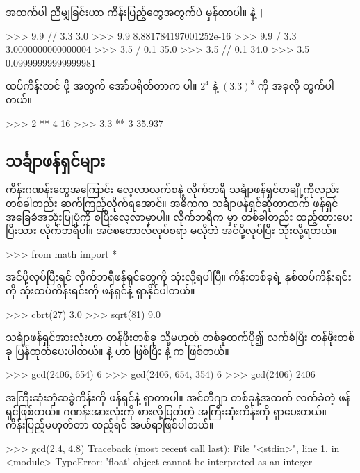 အထက်ပါ ညီမျှခြင်းဟာ ကိန်းပြည့်တွေအတွက်ပဲ မှန်တာပါ။ \fCode{//} နဲ့ \texttt|%
%
\setlength{\fboxsep}{0pt}
\begin{codetxt}
>>> 9.9 // 3.3
3.0
>>> 9.9 %
8.881784197001252e-16
>>> 9.9 / 3.3
3.0000000000000004
>>> 3.5 / 0.1
35.0
>>> 3.5 // 0.1
34.0
>>> 3.5 %
0.09999999999999981
\end{codetxt}
%


ထပ်ကိန်းတင်  ဖို့ အတွက် အော်ပရိတ်တာက \fCode{**}  ပါ။ $2^4$ နဲ့ $(3.3)^3$ ကို အခုလို တွက်ပါတယ်။
%
\setlength{\fboxsep}{0pt}
\begin{codetxt}
>>> 2 ** 4
16
>>> 3.3 ** 3
35.937
\end{codetxt}
%

\subsection*{သင်္ချာဖန်ရှင်များ}
ကိန်းဂဏန်းတွေအကြောင်း လေ့လာလက်စနဲ့  လိုက်ဘရီ သင်္ချာဖန်ရှင်တချို့ကိုလည်း တစ်ခါတည်း ဆက်ကြည့်လိုက်ရအောင်။ အဓိကက သင်္ချာဖန်ရှင်ဆိုတာထက် ဖန်ရှင် အခြေခံအသုံးပြုပုံကို စပြီးလေ့လာမှာပါ။  လိုက်ဘရီက  မှာ တစ်ခါတည်း ထည့်ထားပေးပြီးသား  လိုက်ဘရီပါ။ အင်စတောလ်လုပ်စရာ မလိုဘဲ အင်ပို့လုပ်ပြီး သုံးလို့ရတယ်။
\begin{codetxt}
>>> from math import *
\end{codetxt}
အင်ပို့လုပ်ပြီးရင်  လိုက်ဘရီဖန်ရှင်တွေကို သုံးလို့ရပါပြီ။ ကိန်းတစ်ခုရဲ့ နှစ်ထပ်ကိန်းရင်းကို \fEn{,} သုံးထပ်ကိန်းရင်းကို  ဖန်ရှင်နဲ့ ရှာနိုင်ပါတယ်။
\begin{codetxt}
>>> cbrt(27)
3.0
>>> sqrt(81)
9.0  
\end{codetxt}

သင်္ချာဖန်ရှင်အားလုံးဟာ  တန်ဖိုးတစ်ခု သို့မဟုတ် တစ်ခုထက်ပို၍ လက်ခံပြီး  တန်ဖိုးတစ်ခု ပြန်ထုတ်ပေးပါတယ်။  နဲ့   ဟာ  ဖြစ်ပြီး  နဲ့   က  ဖြစ်တယ်။
\begin{codetxt}
>>> gcd(2406, 654)
6
>>> gcd(2406, 654, 354)
6
>>> gcd(2406)
2406
\end{codetxt}
အကြီးဆုံးဘုံဆခွဲကိန်းကို  ဖန်ရှင်နဲ့ ရှာတာပါ။ အင်တီဂျာ  တစ်ခုနဲ့အထက် လက်ခံတဲ့ ဖန်ရှင်ဖြစ်တယ်။  ဂဏန်းအားလုံးကို စားလို့ပြတ်တဲ့ အကြီးဆုံးကိန်းကို ရှာပေးတယ်။ ကိန်းပြည့်မဟုတ်တာ ထည့်ရင် အယ်ရာဖြစ်ပါတယ်။
\begin{codetxt}
>>> gcd(2.4, 4.8)
Traceback (most recent call last):
  File "<stdin>", line 1, in <module>
TypeError: 'float' object cannot be interpreted as an integer
\end{codetxt}

